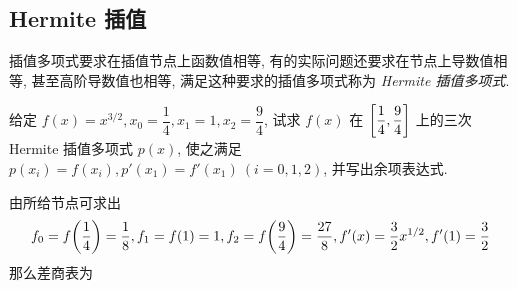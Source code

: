 \subsection{Hermite 插值}

插值多项式要求在插值节点上函数值相等, 有的实际问题还要求在节点上导数值相等, 甚至高阶导数值也相等, 满足这种要求的插值多项式称为 \textit{Hermite 插值多项式}.

\begin{example}
    给定 $f(x)=x^{3/2},x_0=\dfrac{1}{4},x_1=1,x_2=\dfrac{9}{4}$, \label{fxx32x014}试求 $f(x)$ 在 $\qty[\dfrac{1}{4},\dfrac{9}{4}]$ 上的三次 Hermite 插值多项式 $p(x)$, 使之满足
    $p(x_i)=f(x_i),p'(x_1)=f'(x_1)~ (i=0,1,2)$, 并写出余项表达式.
\end{example}
\begin{solution}
    由所给节点可求出 $$f_0=f\qty(\dfrac{1}{4})=\dfrac{1}{8},f_1=f(1)=1,f_2=f\qty(\dfrac{9}{4})=\dfrac{27}{8},f'(x)=\dfrac{3}{2}x^{1/2},f'(1)=\dfrac{3}{2}$$
    那么差商表为
    \begin{table}[H]
        \centering
        \caption{}

\end{table}
\end{solution}
